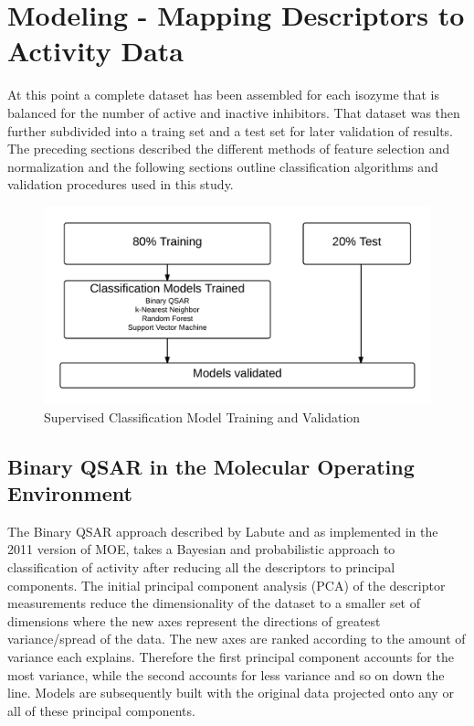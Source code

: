 \section{Modeling - Mapping Descriptors to Activity Data}

At this point a complete dataset has been assembled for each isozyme that is balanced for the number of active and inactive inhibitors. That dataset was then further subdivided into a traing set and a test set for later validation of results. The preceding sections described the different methods of feature selection and normalization and the following sections outline classification algorithms and validation procedures used in this study.

\begin{figure}[H]
  \centering
   \includegraphics[width=1\textwidth]{../img/Model_validation.png}
  \caption{Supervised Classification Model Training and Validation}
\end{figure}

\subsection{Binary QSAR in the Molecular Operating Environment}

The Binary QSAR approach described by Labute \cite{Labute1999} and as implemented in the 2011 version of MOE, takes a Bayesian and probabilistic approach to classification of activity after reducing all the descriptors to principal components. The initial principal component analysis (PCA) of the descriptor measurements reduce the dimensionality of the dataset to a smaller set of dimensions where the new axes represent the directions of greatest variance/spread of the data. The new axes are ranked according to the amount of variance each explains. Therefore the first principal component accounts for the most variance, while the second accounts for less variance and so on down the line. Models are subsequently built with the original data projected onto any or all of these principal components.

